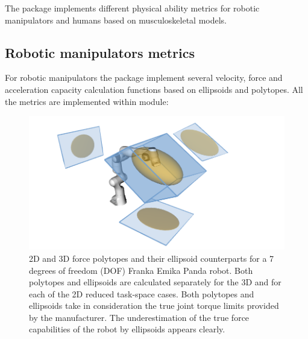 The package implements different physical ability metrics for robotic manipulators and humans based on musculoskeletal models.

\subsection{Robotic manipulators metrics}
\label{sec:pycapacity_robot}

For robotic manipulators the package implement several velocity, force and acceleration capacity calculation functions based on ellipsoids and polytopes. All the metrics are implemented within  module:

\begin{figure}[!h]
    \centering
    \includegraphics[width=0.8\linewidth]{Papers/images/polytope_ellipsoid.png}
    \caption{2D and 3D force polytopes and their ellipsoid counterparts for a 7 degrees of freedom (DOF) Franka Emika Panda robot. Both polytopes and ellipsoids are calculated separately for the 3D and for each of the 2D reduced task-space cases. Both polytopes and ellipsoids take in consideration the true joint torque limits provided by the manufacturer. The underestimation of the true force capabilities of the robot by ellipsoids appears clearly.}
    \label{fig:force_polytope_robot_ellip_revisit}
\end{figure}


